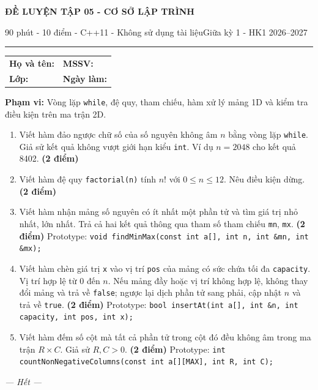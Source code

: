 \documentclass[11pt,a4paper]{article}
\newcommand{\examtitle}[4]{\begin{center}{\Large\bfseries\color{hcmusblue}#1}\par\vspace{3pt}{\large\bfseries #2}\par\vspace{3pt}\small #3\quad\textbullet\quad #4\end{center}\vspace{5pt}\hrule\vspace{8pt}}
\newcommand{\studentline}{\begin{tabularx}{\textwidth}{X X}\textbf{Họ và tên:} \hrulefill & \textbf{MSSV:} \hrulefill\\[7pt]\textbf{Lớp:} \hrulefill & \textbf{Ngày làm:} \hrulefill\end{tabularx}\vspace{8pt}}
\newcommand{\points}[1]{\hfill\textbf{(#1 điểm)}}
\begin{document}
\examtitle{ĐỀ LUYỆN TẬP 05 - CƠ SỞ LẬP TRÌNH}{CƠ SỞ LẬP TRÌNH - HCMUS (theo lịch học tuần 1--5)}{90 phút - 10 điểm - C++11 - Không sử dụng tài liệu}{Giữa kỳ 1 - HK1 2026--2027}

\studentline
\begin{notebox}\textbf{Phạm vi:} Vòng lặp \texttt{while}, đệ quy, tham chiếu, hàm xử lý mảng 1D và kiểm tra điều kiện trên ma trận 2D.\end{notebox}
\begin{enumerate}
\item Viết hàm đảo ngược chữ số của số nguyên không âm $n$ bằng vòng lặp \texttt{while}. Giả sử kết quả không vượt giới hạn kiểu \texttt{int}. Ví dụ $n=2048$ cho kết quả 8402. \points{2}
\item Viết hàm đệ quy \texttt{factorial(n)} tính $n!$ với $0\le n\le12$. Nêu điều kiện dừng. \points{2}
\item Viết hàm nhận mảng số nguyên có ít nhất một phần tử và tìm giá trị nhỏ nhất, lớn nhất. Trả cả hai kết quả thông qua tham số tham chiếu \texttt{mn}, \texttt{mx}. \points{2}
Prototype: \texttt{void findMinMax(const int a[], int n, int \&mn, int \&mx);}
\item Viết hàm chèn giá trị \texttt{x} vào vị trí \texttt{pos} của mảng có sức chứa tối đa \texttt{capacity}. Vị trí hợp lệ từ 0 đến $n$. Nếu mảng đầy hoặc vị trí không hợp lệ, không thay đổi mảng và trả về \texttt{false}; ngược lại dịch phần tử sang phải, cập nhật $n$ và trả về \texttt{true}. \points{2}
Prototype: \texttt{bool insertAt(int a[], int \&n, int capacity, int pos, int x);}
\item Viết hàm đếm số cột mà tất cả phần tử trong cột đó đều không âm trong ma trận $R\times C$. Giả sử $R,C>0$. \points{2}
Prototype: \texttt{int countNonNegativeColumns(const int a[][MAX], int R, int C);}
\end{enumerate}
\vfill\begin{center}\textit{--- Hết ---}\end{center}
\end{document}
